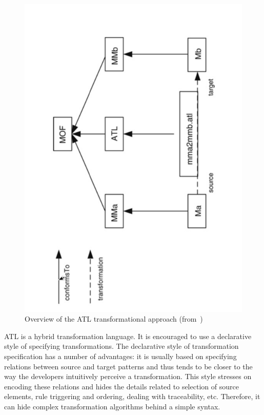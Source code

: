 \documentclass{llncs}
\begin{document}
\begin{figure}
	\centering
	\includegraphics[angle=270, width=1\textwidth,natwidth=610,natheight=642]{figures/Overview_ATL.pdf}
	\caption{Overview of the ATL transformational approach (from~\cite{atl:frederic})}
	\label{fig:overview_atl}
\end{figure}

ATL is a hybrid transformation language. It is encouraged to use a declarative style of specifying transformations. The declarative style of transformation specification has a number of advantages: it is usually based on specifying relations between source and target patterns and thus tends to be closer to the way the developers intuitively perceive a transformation. This style stresses on encoding these relations and hides the details related to selection of source elements, rule triggering and ordering, dealing with traceability, etc. Therefore, it can hide complex transformation algorithms behind a simple syntax.\cite{atl:frederic}
\end{document}
